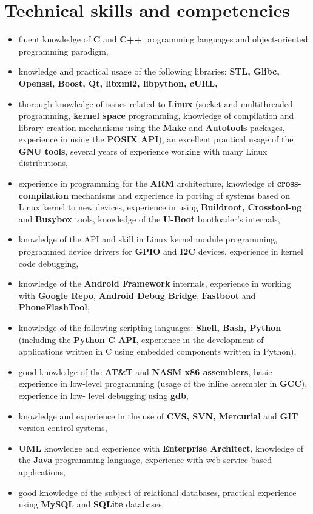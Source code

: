 \documentclass[10pt]{article}
\begin{document}
\section*{Technical skills and competencies}
\begin{itemize}
	\item fluent knowledge of \textbf{C} and \textbf{C++} programming languages and object-oriented
	programming paradigm,
	\item knowledge and practical usage of the following libraries: \textbf{STL, Glibc, Openssl,
	Boost, Qt, libxml2, libpython, cURL,}
	\item thorough knowledge of issues related to \textbf{Linux} (socket and multithreaded
	programming, \textbf{kernel space} programming, knowledge of compilation and library
	creation mechanisms using the \textbf{Make} and \textbf{Autotools} packages, experience in
	using the \textbf{POSIX API}), an excellent practical usage of the \textbf{GNU tools}, several
	years of experience working with many Linux distributions,
	\item experience in programming for the \textbf{ARM} architecture, knowledge of \textbf{cross-
	compilation} mechanisms and experience in porting of systems based on Linux
	kernel to new devices, experience in using \textbf{Buildroot, Crosstool-ng} and \textbf{Busybox}
	tools, knowledge of the \textbf{U-Boot} bootloader's internals,
	\item knowledge of the API and skill in Linux kernel module programming, programmed
	device drivers for \textbf{GPIO} and \textbf{I2C} devices, experience in kernel code debugging,
	\item knowledge of the \textbf{Android Framework} internals, experience in working with
	\textbf{Google Repo}, \textbf{Android Debug Bridge}, \textbf{Fastboot} and \textbf{PhoneFlashTool},
	\item knowledge of the following scripting languages: \textbf{Shell, Bash, Python} (including
	the \textbf{Python C API}, experience in the development of applications written in C
	using embedded components written in Python),
	\item good knowledge of the \textbf{AT\&T} and \textbf{NASM x86 assemblers}, basic experience in
	low-level programming (usage of the inline assembler in \textbf{GCC}), experience in low-
	level debugging using \textbf{gdb},
	\item knowledge and experience in the use of \textbf{CVS, SVN, Mercurial} and \textbf{GIT} version
	control systems,
	\item \textbf{UML} knowledge and experience with \textbf{Enterprise Architect},
	knowledge of the \textbf{Java} programming language, experience with web-service based
	applications,
	\item good knowledge of the subject of relational databases, practical experience using
	\textbf{MySQL} and \textbf{SQLite} databases.
\end{itemize}
\end{document}
